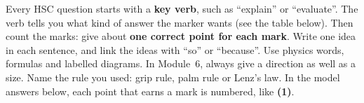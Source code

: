 
\newcommand\ansPt[1]{\textcolor{hscbrand}{\bfseries(#1)}}

Every HSC question starts with a \textbf{key verb}, such as ``explain'' or ``evaluate''.
The verb tells you what kind of answer the marker wants (see the table below). Then count the
marks: give about \textbf{one correct point for each mark}. Write one idea in each sentence,
and link the ideas with ``so'' or ``because''. Use physics words, formulas and labelled
diagrams. In Module~6, always give a direction as well as a size. Name the rule you used:
grip rule, palm rule or Lenz's law. In the model answers below, each point that earns a mark
is numbered, like \ansPt{1}.

